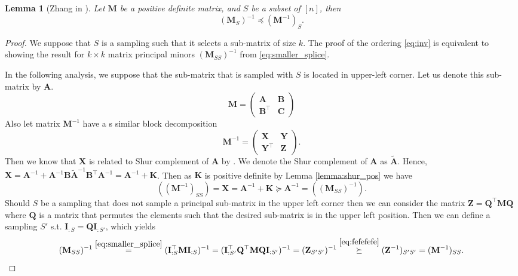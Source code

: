 \documentclass[11pt]{article}
\newtheorem{lemma}{Lemma}
\newcommand{\bM}{\mathbf{M}}
\begin{document}
	
	\begin{lemma}[Zhang in \cite{Zhang2011}] \label{lemma:order}
		Let $\bM$ be a positive definite matrix, and $S$ be a subset of $[n]$, then
		\begin{equation}\label{eq:inv}
			(\mathbf{M}_S)^{-1} \preceq (\mathbf{M}^{-1})_S.
		\end{equation}
	\end{lemma}
	\begin{proof}
		We suppose that $S$ is a sampling such that it selects a sub-matrix of size $k$. The proof of the ordering \eqref{eq:inv} is equivalent to showing the result for $k \times k$ matrix principal minors $(\bM_{SS})^{-1}$ from \eqref{eq:smaller_splice}. 
		
		In the following analysis, we suppose that the sub-matrix that is sampled with $S$ is located in upper-left corner. Let us denote this sub-matrix by  $\mathbf{A}$. 
		\begin{equation}
			\mathbf{M}=\begin{pmatrix}
				\mathbf{A} & \mathbf{B} \\
				\mathbf{B}^\top & \mathbf{C} 
			\end{pmatrix}
		\end{equation}
		Also let matrix $\mathbf{M}^{-1}$ have a s similar block decomposition
		\begin{equation}
			\mathbf{M}^{-1}=\begin{pmatrix}
				\mathbf{X} & \mathbf{Y} \\
				\mathbf{Y}^\top & \mathbf{Z} 
			\end{pmatrix}.
		\end{equation}
		Then we know that $\mathbf{X}$ is related to Shur complement of $\mathbf{A}$  by \cite[Theorem 2.4]{Zhang2011}. We denote the Shur complement of $\mathbf{A}$ as  $\tilde{\mathbf{A}}$. Hence, $\mathbf{X}=\mathbf{A}^{-1}+\mathbf{A}^{-1}\mathbf{B}\tilde{\mathbf{A}}^{-1}\mathbf{B}^\top \mathbf{A}^{-1}=\mathbf{A}^{-1}+\mathbf{K}$. Then as $\mathbf{K}$ is positive definite by Lemma \ref{lemma:shur_pos} we have
		\begin{equation} \label{eq:fefefefe}
			((\mathbf{M}^{-1})_{SS})=\mathbf{X}=\mathbf{A}^{-1}+\mathbf{K} \succeq \mathbf{A}^{-1} = ((\mathbf{M}_{SS})^{-1}).
		\end{equation}
		Should $S$ be a sampling that does not sample a principal sub-matrix in the upper left corner then we can consider the matrix $\mathbf{Z}=\mathbf{Q}^\top \mathbf{M}\mathbf{Q}$ where $\mathbf{Q}$ is a matrix that permutes the elements such that the desired sub-matrix is in the upper left position. Then we can define a sampling $S'$ s.t. $\mathbf{I}_{:S}= \mathbf{Q}\mathbf{I}_{:S'}$, which yields	
		\begin{equation*} 
			(\mathbf{M}_{SS})^{-1}\stackrel{\eqref{eq:smaller_splice}}=(\mathbf{I}_{:S}^\top \mathbf{M}\mathbf{I}_{:S})^{-1}=(\mathbf{I}_{:S'}^\top \mathbf{Q}^\top \mathbf{M}\mathbf{Q}\mathbf{I}_{:S'})^{-1} =(\mathbf{Z}_{S'S'})^{-1} \stackrel{\eqref{eq:fefefefe}}\succeq (\mathbf{Z}^{-1})_{S'S'}=(\mathbf{M}^{-1})_{SS}.
			\end{equation*}
	\end{proof}
	
\end{document}

